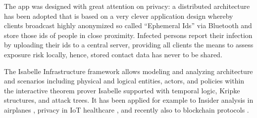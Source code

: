 \documentclass{llncs}
\begin{document}
The app was designed with great
attention on privacy: a distributed architecture \cite{cwa:arch} has been adopted %
that is
based on a very clever application design whereby clients broadcast
highly anonymized so called ``Ephemeral Ids'' via Bluetooth and
store those ids of people in close proximity.
Infected persons report their infection by uploading their ids to a central server, providing all clients the means to assess exposure risk locally,
hence, stored contact data has never to be shared.
%
%

The Isabelle Infrastructure framework \cite{kam:20a} allows modeling and analyzing
architecture and scenarios including physical and logical entities, actors, and policies
within the interactive theorem prover Isabelle supported with temporal logic, Kripke
structures, and attack trees. It has been applied for example to Insider analysis in
airplanes \cite{kam:20b}, privacy in IoT healthcare \cite{kam:18b}, and recently also
to blockchain protocols \cite{kn:20}.
\end{document}
